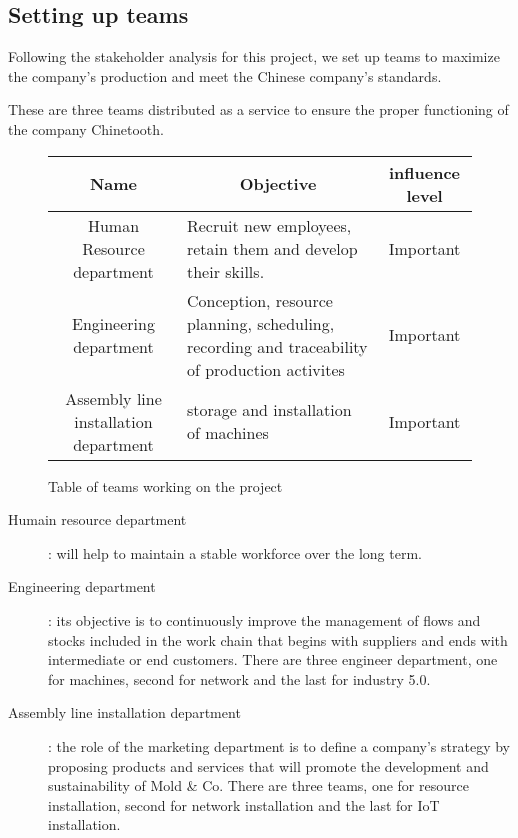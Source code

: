 \subsection{Setting up teams}

Following the stakeholder analysis for this project, we set up teams to maximize the company's production and meet the Chinese company's standards.

These are three teams distributed as a service to ensure the proper functioning of the company Chinetooth.

\begin{figure}[h]
\centering
\begin{tabular}{| c | p{6cm} | c |}
    \hline
    \rowcolor{heading-color}Name & \multicolumn{1}{c|}{Objective} & influence level \\
    \hline
    Human Resource department & Recruit new employees, retain them and develop their skills. & Important \\
    \hline
    Engineering department & Conception, resource planning, scheduling, recording and traceability of production activites & Important \\
    \hline 
    Assembly line installation department & storage and installation of machines & Important \\
    \hline 
\end{tabular}
\caption{Table of teams working on the project}
\end{figure}

\begin{description}
    \item[Humain resource department]: will help to maintain a stable workforce over the long term.
    \item[Engineering department]: its objective is to continuously improve the management of flows and stocks included in the work chain that begins with suppliers and ends with intermediate or end customers. There are three engineer department, one for machines, second for network and the last for industry 5.0.
    \item[Assembly line installation department]: the role of the marketing department is to define a company's strategy by proposing products and services that will promote the development and sustainability of Mold \& Co. There are three teams, one for resource installation, second for network installation and the last for IoT installation.
\end{description} 
